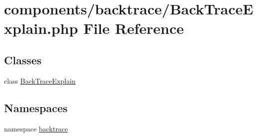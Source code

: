 \hypertarget{_back_trace_explain_8php}{
\section{components/backtrace/BackTraceExplain.php File Reference}
\label{_back_trace_explain_8php}
}
\subsection*{Classes}
\begin{CompactItemize}
\item 
class \hyperlink{class_back_trace_explain}{BackTraceExplain}
\end{CompactItemize}
\subsection*{Namespaces}
\begin{CompactItemize}
\item 
namespace \hyperlink{namespacebacktrace}{backtrace}
\end{CompactItemize}
